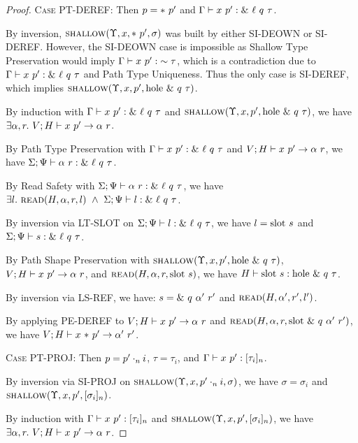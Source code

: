 \documentclass{article}
\begin{document}
\begin{proof}
  \textsc{Case PT-DEREF}:
    Then $p = *\ {p'}$ and ${{\Gamma}} \vdash {{x}\ {p'}} : {{\&\ {\ell}\ {q}\ {\tau}}}$.

    By inversion, $\textsc{shallow}({\Upsilon},{x},{*\ {p'}},{\sigma})$ was built by either
    \textsc{SI-DEOWN} or \textsc{SI-DEREF}. However, the \textsc{SI-DEOWN} case is
    impossible as Shallow Type Preservation would imply
    ${{\Gamma}} \vdash {{x}\ {p'}} : {{\sim {\tau}}}$, which is a contradiction due to
    ${{\Gamma}} \vdash {{x}\ {p'}} : {{\&\ {\ell}\ {q}\ {\tau}}}$ and Path Type Uniqueness.
    Thus the only case is \textsc{SI-DEREF}, which implies
    $\textsc{shallow}({\Upsilon},{x},{p'},{\textrm{hole}\ {\&\ {q}\ {\tau}}})$.

    By induction with ${{\Gamma}} \vdash {{x}\ {p'}} : {{\&\ {\ell}\ {q}\ {\tau}}}$ and
    $\textsc{shallow}({\Upsilon},{x},{p'},{\textrm{hole}\ {\&\ {q}\ {\tau}}})$, we have
    $\exists \alpha, r.\ \PEval{V}{H}{x}{p'}{\alpha}{r}$.

    By Path Type Preservation with ${{\Gamma}} \vdash {{x}\ {p'}} : {{\&\ {\ell}\ {q}\ {\tau}}}$ and
    ${{V};{H}} \vdash {{x}\ {p'}} \rightarrow {{\alpha}\ {r}}$, we have
    ${{{\Sigma}} ;{{\Psi}}} \vdash {{{\alpha}\ {r}}} : {{{\&\ {\ell}\ {q}\ {\tau}}}}$.

    By Read Safety with ${{{\Sigma}} ;{{\Psi}}} \vdash {{{\alpha}\ {r}}} : {{{\&\ {\ell}\ {q}\ {\tau}}}}$, we have
    $\exists l.\ \Read{H}{\alpha}{r}{l}\ \land\ \RTType{\Sigma}{\Psi}{l}{\Ref{\ell}{q}{\tau}}$.

    By inversion via \textsc{LT-SLOT} on ${{\Sigma} ;{\Psi}} \vdash {{l}} : {{\&\ {\ell}\ {q}\ {\tau}}}$,
    we have $l = \textrm{slot}\ {s}$ and ${{\Sigma} ;{\Psi}} \vdash {{s}} : {{\&\ {\ell}\ {q}\ {\tau}}}$.

    By Path Shape Preservation with $\textsc{shallow}({\Upsilon},{x},{p'},{\textrm{hole}\ {\&\ {q}\ {\tau}}})$,
    ${{V};{H}} \vdash {{x}\ {p'}} \rightarrow {{\alpha}\ {r}}$, and $\textsc{read}({H},{\alpha},{r},{\textrm{slot}\ {s}})$, we have
    ${H} \vdash {\textrm{slot}\ {s}} : {\textrm{hole}\ {\&\ {q}\ {\tau}}}$.

    By inversion via \textsc{LS-REF}, we have: $s = \&\ {q}\ {\alpha'}\ {r'}$ and
    $\textsc{read}({H},{\alpha'},{r'},{l'})$.

    By applying \textsc{PE-DEREF} to ${{V};{H}} \vdash {{x}\ {p'}} \rightarrow {{\alpha}\ {r}}$ and
    $\textsc{read}({H},{\alpha},{r},{\textrm{slot}\ {\&\ {q}\ {\alpha'}\ {r'}}})$, we have
    ${{V};{H}} \vdash {{x}\ {*\ {p'}}} \rightarrow {{\alpha'}\ {r'}}$.

  \textsc{Case PT-PROJ}:
    Then $p = {p'}\cdot_{n} {i}$, $\tau = \tau_i$, and ${{\Gamma}} \vdash {{x}\ {p'}} : {{[ {\tau_i} ]_{n}}}$.

    By inversion via \textsc{SI-PROJ} on $\textsc{shallow}({\Upsilon},{x},{{p'}\cdot_{n} {i}},{\sigma})$,
    we have $\sigma = \sigma_i$ and $\textsc{shallow}({\Upsilon},{x},{p'},{[ {\sigma_i} ]_{n}})$.

    By induction with ${{\Gamma}} \vdash {{x}\ {p'}} : {{[ {\tau_i} ]_{n}}}$
    and $\textsc{shallow}({\Upsilon},{x},{p'},{[ {\sigma_i} ]_{n}})$,
    we have $\exists \alpha, r.\ \PEval{V}{H}{x}{p'}{\alpha}{r}$.


\end{proof}
\end{document}
